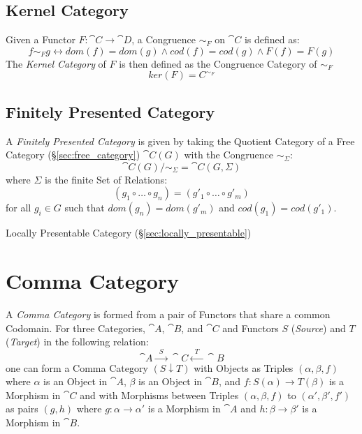 \subsection{Kernel Category}\label{sec:kernel_category}

Given a Functor $F : \cat{C} \rightarrow \cat{D}$, a Congruence
$\sim_F$ on $\cat{C}$ is defined as:
\[
  f \sim_F g \leftrightarrow dom(f) = dom(g) \wedge cod(f) = cod(g)
  \wedge F(f) = F(g)
\]
The \emph{Kernel Category} of $F$ is then defined as the Congruence
Category of $\sim_F$
\[
  ker(F) = C^{\sim_F}
\]



\subsection{Finitely Presented Category}
\label{sec:finitely_presented}

A \emph{Finitely Presented Category} is given by taking the Quotient
Category of a Free Category (\S\ref{sec:free_category})
$\cat{C}(G)$ with the Congruence $\sim_\Sigma$:
\[
  \cat{C}(G) / \sim_{\Sigma} = \cat{C}(G,\Sigma)
\]
where $\Sigma$ is the finite Set of Relations:
\[
  (g_1 \circ \ldots \circ g_n) = (g'_1 \circ \ldots \circ g'_m)
\]
for all $g_i \in G$ such that $dom(g_n) = dom(g'_m)$ and $cod(g_1) =
cod(g'_1)$.

\fist Locally Presentable Category (\S\ref{sec:locally_presentable})



\section{Comma Category}\label{sec:comma_category}

A \emph{Comma Category} is formed from a pair of Functors that share a
common Codomain. For three Categories, $\cat{A}$, $\cat{B}$, and
$\cat{C}$ and Functors $S$ (\emph{Source}) and $T$ (\emph{Target}) in
the following relation:
\[
  \cat{A} \xrightarrow{\;\; S\;\;} \cat{C} \xleftarrow{\;\;
    T\;\;} \cat{B}
\]
one can form a Comma Category $(S \downarrow T)$ with Objects as
Triples $(\alpha, \beta, f)$ where $\alpha$ is an Object in
$\cat{A}$, $\beta$ is an Object in $\cat{B}$, and $f : S(\alpha)
\rightarrow T(\beta)$ is a Morphism in $\cat{C}$ and with Morphisms
between Triples $(\alpha, \beta, f)$ to $(\alpha', \beta', f')$ as
pairs $(g,h)$ where $g : \alpha \rightarrow \alpha'$ is a Morphism in
$\cat{A}$ and $h : \beta \rightarrow \beta'$ is a Morphism in
$\cat{B}$.

